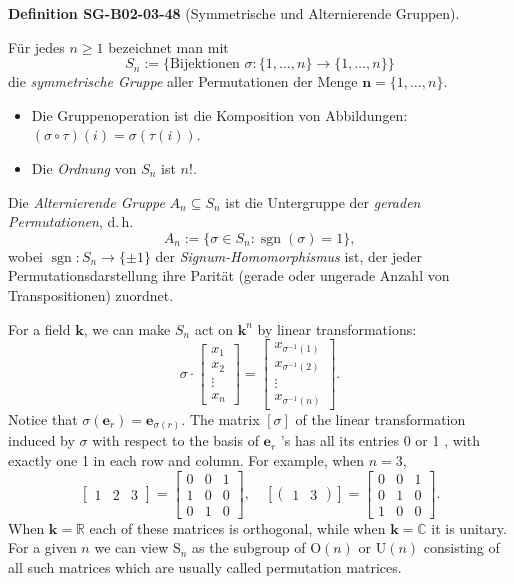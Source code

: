 \documentclass[10pt, letterpaper]{article}
\newcommand{\sgn}{\operatorname{sgn}}
\newcommand{\CustomHeading}[3]{%
  \par\medskip\noindent%
  \textbf{#1 #2} \textnormal{(#3)}.\enskip%
}
\newenvironment{DEF}[2]{\begin{unitbox}\CustomHeading{Definition}{#1}{#2}}{\end{unitbox}}
\begin{document}
\begin{DEF}{SG-B02-03-48}{Symmetrische und Alternierende Gruppen}
Für jedes \(n \ge 1\) bezeichnet man mit
\[
S_n := \{\text{Bijektionen } \sigma : \{1,\ldots,n\}\to\{1,\ldots,n\}\}
\]
die \emph{symmetrische Gruppe} aller Permutationen der Menge
\(\mathbf{n} = \{1,\ldots,n\}\).

\begin{itemize}
\item Die Gruppenoperation ist die Komposition von Abbildungen:
      \((\sigma\circ\tau)(i) = \sigma(\tau(i))\).
\item Die \emph{Ordnung} von \(S_n\) ist \(n!\).
\end{itemize}

Die \emph{Alternierende Gruppe} \(A_n\subseteq S_n\) ist die Untergruppe der
\emph{geraden Permutationen}, d.\,h.
\[
A_n := \{\sigma\in S_n : \sgn(\sigma)=1\},
\]
wobei \(\sgn:S_n\to\{\pm1\}\) der \emph{Signum-Homomorphismus} ist, der jeder
Permutationsdarstellung ihre Parität (gerade oder ungerade Anzahl von
Transpositionen) zuordnet.
\end{DEF}


For a field $\mathbf{k}$, we can make $S_{n}$ act on $\mathbf{k}^{n}$ by linear transformations:
$$
\sigma \cdot\left[\begin{array}{c}
x_{1} \\
x_{2} \\
\vdots \\
x_{n}
\end{array}\right]=\left[\begin{array}{c}
x_{\sigma^{-1}(1)} \\
x_{\sigma^{-1}(2)} \\
\vdots \\
x_{\sigma^{-1}(n)}
\end{array}\right] .
$$
Notice that $\sigma\left(\mathbf{e}_{r}\right)=\mathbf{e}_{\sigma(r)}$. The matrix $[\sigma]$ of the linear transformation induced by $\sigma$ with respect to the basis of $\mathbf{e}_{r}$ 's has all its entries 0 or 1 , with exactly one 1 in each row and column. For example, when $n=3$,
$$
\left[\begin{array}{lll}
1 & 2 & 3
\end{array}\right]=\left[\begin{array}{lll}
0 & 0 & 1 \\
1 & 0 & 0 \\
0 & 1 & 0
\end{array}\right], \quad\left[\left(\begin{array}{ll}
1 & 3
\end{array}\right)\right]=\left[\begin{array}{lll}
0 & 0 & 1 \\
0 & 1 & 0 \\
1 & 0 & 0
\end{array}\right] .
$$
When $\mathbf{k}=\mathbb{R}$ each of these matrices is orthogonal, while when $\mathbf{k}=\mathbb{C}$ it is unitary. For a given $n$ we can view $\mathrm{S}_{n}$ as the subgroup of $\mathrm{O}(n)$ or $\mathrm{U}(n)$ consisting of all such matrices which are usually called permutation matrices.
\end{document}
